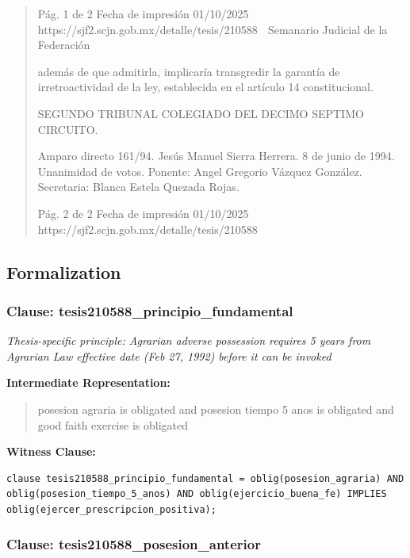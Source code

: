 \documentclass[11pt,a4paper]{article}
\begin{document}
\begin{quote}
                                              Pág. 1 de 2             Fecha de impresión 01/10/2025
  https://sjf2.scjn.gob.mx/detalle/tesis/210588
                                                  Semanario Judicial de la Federación

además de que admitirla, implicaría transgredir la garantía de irretroactividad de la ley, establecida
en el artículo 14 constitucional.

SEGUNDO TRIBUNAL COLEGIADO DEL DECIMO SEPTIMO CIRCUITO.


Amparo directo 161/94. Jesús Manuel Sierra Herrera. 8 de junio de 1994. Unanimidad de votos.
Ponente: Angel Gregorio Vázquez González. Secretaria: Blanca Estela Quezada Rojas.




                                             Pág. 2 de 2             Fecha de impresión 01/10/2025
  https://sjf2.scjn.gob.mx/detalle/tesis/210588

\end{quote}

\subsection{Formalization}

\subsubsection{Clause: tesis210588\_principio\_fundamental}

\textit{Thesis-specific principle: Agrarian adverse possession requires 5 years from Agrarian Law effective date (Feb 27, 1992) before it can be invoked}

\textbf{Intermediate Representation:}

\begin{quote}
posesion agraria is obligated and posesion tiempo 5 anos is obligated and good faith exercise is obligated
\end{quote}

\textbf{Witness Clause:}

\begin{lstlisting}[style=witnessstyle, language=Witness]
clause tesis210588_principio_fundamental = oblig(posesion_agraria) AND oblig(posesion_tiempo_5_anos) AND oblig(ejercicio_buena_fe) IMPLIES oblig(ejercer_prescripcion_positiva);
\end{lstlisting}

\subsubsection{Clause: tesis210588\_posesion\_anterior}
\end{document}
